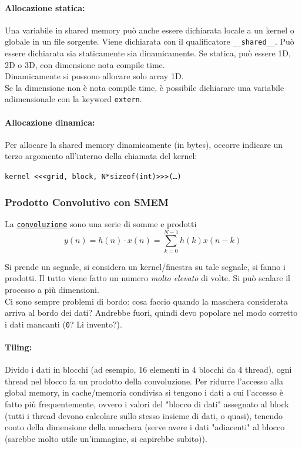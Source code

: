 \paragraph{Allocazione statica:} Una variabile in shared memory può anche essere dichiarata locale a un kernel o globale in un file sorgente. Viene dichiarata con il qualificatore \texttt{\_\_shared\_\_}. Può essere dichiarata sia staticamente sia dinamicamente. Se statica, può essere 1D, 2D o 3D, con dimensione nota compile time.\\
Dinamicamente si possono allocare solo array 1D.\\

Se la dimensione non è nota compile time, è possibile dichiarare una variabile adimensionale con la keyword \texttt{extern}.\\

\paragraph{Allocazione dinamica:} Per allocare la shared memory dinamicamente (in bytes), occorre indicare un terzo argomento all'interno della chiamata del kernel:
\begin{center}
	\texttt{kernel <<<grid, block, N*sizeof(int)>>>(\dots)}
\end{center}


\newpage

\subsubsection{Prodotto Convolutivo con SMEM}
La \href{https://it.wikipedia.org/wiki/Convoluzione}{\texttt{convoluzione}} sono una serie di somme e prodotti
$$ y(n) = h(n) \cdot x(n) = \sum_{k=0}^{N-1} h(k) x(n-k) $$

Si prende un segnale, si considera un kernel/finestra su tale segnale, si fanno i prodotti. Il tutto viene fatto un numero \textit{molto elevato} di volte. Si può scalare il processo a più dimensioni.\\

Ci sono sempre problemi di bordo: cosa faccio quando la maschera considerata arriva al bordo dei dati? Andrebbe fuori, quindi devo popolare nel modo corretto i dati mancanti (\texttt{0}? Li invento?).\\

\paragraph{Tiling:} Divido i dati in blocchi (ad esempio, 16 elementi in 4 blocchi da 4 thread), ogni thread nel blocco fa un prodotto della convoluzione. Per ridurre l'accesso alla global memory, in cache/memoria condivisa si tengono i dati a cui l'accesso è fatto più frequentemente, ovvero i valori del "blocco di dati" assegnato al block (tutti i thread devono calcolare sullo stesso insieme di dati, o quasi), tenendo conto della dimensione della maschera (serve avere i dati "adiacenti" al blocco (sarebbe molto utile un'immagine, si capirebbe subito)).\\

